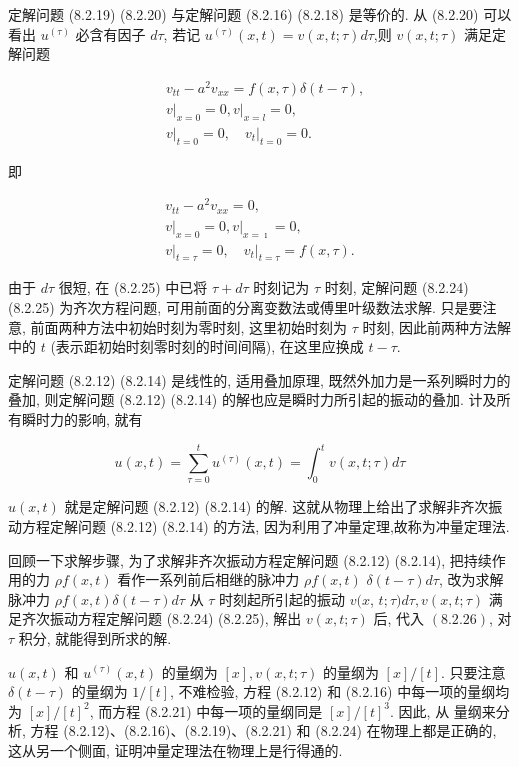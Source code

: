 \begin{solution}
定解问题 (8.2.19) (8.2.20) 与定解问题 (8.2.16) (8.2.18) 是等价的. 从 (8.2.20) 可以看出 $u^{(\tau)}$ 必含有因子 $d \tau$, 若记 $u^{(\tau)}(x, t)=v(x, t ; \tau) d \tau$,则 $v(x, t ; \tau)$ 满足定解问题

$$
\begin{aligned}
& v_{t t}-a^{2} v_{x x}=f(x, \tau) \delta(t-\tau), \\
&\left.v\right|_{x=0}=0,\left.v\right|_{x=l}=0, \\
&\left.v\right|_{t=0}=0,\left.\quad v_{t}\right|_{t=0}=0 .
\end{aligned}
$$

即

$$
\begin{gathered}
v_{t t}-a^{2} v_{x x}=0, \\
\left.v\right|_{x=0}=0,\left.v\right|_{x=\imath}=0, \\
\left.v\right|_{t=\tau}=0,\left.\quad v_{t}\right|_{t=\tau}=f(x, \tau) .
\end{gathered}
$$

由于 $d \tau$ 很短, 在 (8.2.25) 中已将 $\tau+d \tau$ 时刻记为 $\tau$ 时刻, 定解问题 (8.2.24) (8.2.25) 为齐次方程问题, 可用前面的分离变数法或傅里叶级数法求解. 只是要注意, 前面两种方法中初始时刻为零时刻, 这里初始时刻为 $\tau$ 时刻, 因此前两种方法解中的 $t$ (表示距初始时刻零时刻的时间间隔), 在这里应换成 $t-\tau$.

定解问题 (8.2.12) (8.2.14) 是线性的, 适用叠加原理, 既然外加力是一系列瞬时力的叠加, 则定解问题 (8.2.12) (8.2.14) 的解也应是瞬时力所引起的振动的叠加. 计及所有瞬时力的影响, 就有

$$
u(x, t)=\sum_{\tau=0}^{t} u^{(\tau)}(x, t)=\int_{0}^{t} v(x, t ; \tau) d \tau
$$

$u(x, t)$ 就是定解问题 (8.2.12) (8.2.14) 的解. 这就从物理上给出了求解非齐次振动方程定解问题 (8.2.12) (8.2.14) 的方法, 因为利用了冲量定理,故称为冲量定理法.

回顾一下求解步骤, 为了求解非齐次振动方程定解问题 (8.2.12) (8.2.14), 把持续作用的力 $\rho f(x, t)$ 看作一系列前后相继的脉冲力 $\rho f(x, t)$ $\delta(t-\tau) d \tau$, 改为求解脉冲力 $\rho f(x, t) \delta(t-\tau) d \tau$ 从 $\tau$ 时刻起所引起的振动 $v(x$, $t ; \tau) d \tau, v(x, t ; \tau)$ 满足齐次振动方程定解问题 (8.2.24) (8.2.25), 解出 $v(x, t ; \tau)$ 后, 代入 $(8.2 .26)$, 对 $\tau$ 积分, 就能得到所求的解.

$u(x, t)$ 和 $u^{(\tau)}(x, t)$ 的量纲为 $[x], v(x, t ; \tau)$ 的量纲为 $[x] /[t]$. 只要注意 $\delta(t-\tau)$ 的量纲为 $1 /[t]$, 不难检验, 方程 (8.2.12) 和 (8.2.16) 中每一项的量纲均为 $[x] /[t]^{2}$, 而方程 (8.2.21) 中每一项的量纲同是 $[x] /[t]^{3}$. 因此, 从
量纲来分析, 方程 (8.2.12)、(8.2.16)、(8.2.19)、(8.2.21) 和 (8.2.24) 在物理上都是正确的, 这从另一个侧面, 证明冲量定理法在物理上是行得通的.


\end{solution}
